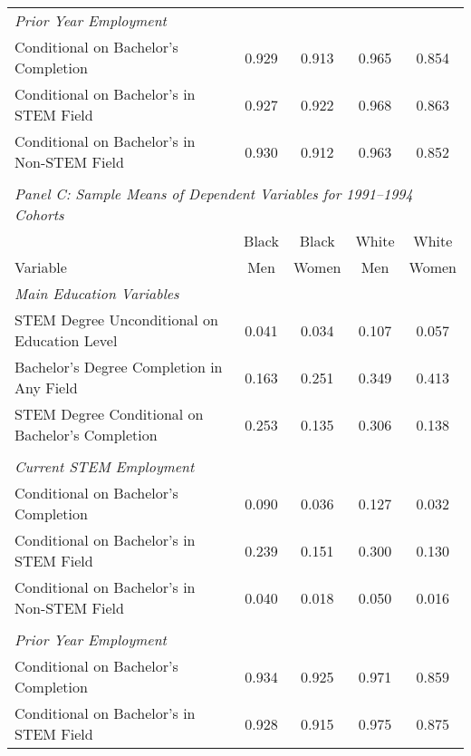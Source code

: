 \begin{table}[ht]
{\begin{threeparttable}
\begin{tabular}{lcccc}
\emph{Prior Year Employment}                            &       &        &       &       \\
Conditional on Bachelor's Completion                    & 0.929 & 0.913 & 0.965 & 0.854 \\ 
Conditional on Bachelor's in STEM Field                 & 0.927 & 0.922 & 0.968 & 0.863 \\ 
Conditional on Bachelor's in Non-STEM Field             & 0.930 & 0.912 & 0.963 & 0.852 \\ 
&&&&\\
\multicolumn{5}{l}{\emph{Panel C: Sample Means of Dependent Variables for 1991--1994 Cohorts}}\\
\midrule 
         & Black           & Black        & White        & White       \\
Variable & Men             & Women        & Men          & Women       \\
\midrule 
\emph{Main Education Variables}                         &       &        &       &       \\
STEM Degree Unconditional on Education Level            & 0.041 & 0.034 & 0.107 & 0.057 \\ 
Bachelor's Degree Completion in Any Field               & 0.163 & 0.251 & 0.349 & 0.413 \\ 
STEM Degree Conditional on Bachelor's Completion        & 0.253 & 0.135 & 0.306 & 0.138 \\ 
                                                        &       &        &       &       \\
\emph{Current STEM Employment}                          &       &        &       &       \\
Conditional on Bachelor's Completion                    & 0.090 & 0.036 & 0.127 & 0.032 \\ 
Conditional on Bachelor's in STEM Field                 & 0.239 & 0.151 & 0.300 & 0.130 \\ 
Conditional on Bachelor's in Non-STEM Field             & 0.040 & 0.018 & 0.050 & 0.016 \\ 
                                                        &       &        &       &       \\
\emph{Prior Year Employment}                            &       &        &       &       \\
Conditional on Bachelor's Completion                    & 0.934 & 0.925 & 0.971 & 0.859 \\ 
Conditional on Bachelor's in STEM Field                 & 0.928 & 0.915 & 0.975 & 0.875 \\ 

\end{tabular}
\end{threeparttable}}
\end{table}
